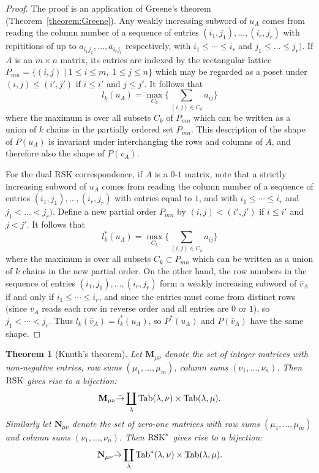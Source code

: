 \documentclass[11pt]{amsart}
\newtheorem{theorem}{Theorem}[subsection]
\theoremstyle{definition}
\theoremstyle{example}
\newcommand{\Tab}{\textup{Tab}}
\newcommand{\rsk}{\textup{RSK}}
\begin{document}
\begin{proof}
  The proof is an application of Greene's theorem (Theorem~\ref{theorem:Greene}).
  Any weakly increasing subword of $u_A$ comes from reading the column number of a sequence of entries $(i_1,j_1),\dotsc,(i_r,j_r)$ with repititions of up to $a_{i_1j_1},\dotsc, a_{i_rj_r}$ respectively, with $i_1\leq \dotsb \leq i_r$ and $j_1\leq \dotsc\leq j_r)$.
  If $A$ is an $m\times n$ matrix, its entries are indexed by the rectangular lattice $P_{mn} = \{(i,j)\mid 1\leq i\leq m,\;1\leq j\leq n\}$ which may be regarded as a poset under $(i,j)\leq (i',j')$ if $i\leq i'$ and $j\leq j'$.
  It follows that
  \begin{displaymath}
    l_k(u_A) = \max_{C_k} \Big\{\sum_{(i,j)\in C_k} a_{ij}\Big\}
  \end{displaymath}
  where the maximum is over all subsets $C_k$ of $P_{mn}$ which can be written as a union of $k$ chains in the partially ordered set $P_{mn}$.
  This description of the shape of $P(u_A)$ is invariant under interchanging the rows and columns of $A$, and therefore also the shape of $P(v_A)$.

  For the dual RSK correspondence, if $A$ is a $0$-$1$ matrix, note that a strictly increasing subword of $u_A$ comes from reading the column number of a sequence of entries $(i_1,j_1),\dotsc,(i_r,j_r)$ with entries equal to $1$, and with $i_1\leq \dotsb \leq i_r$ and $j_1<\dotsc<j_r)$.
  Define a new partial order $P_{mn}$ by $(i,j)<(i',j')$ if $i\leq i'$ and $j<j'$.
  It follows that
  \begin{displaymath}
    l_k^*(u_A) = \max_{C_k} \Big\{\sum_{(i,j)\in C_k} a_{ij}\Big\}
  \end{displaymath}
  where the maximum is over all subsets $C_k\subset P_{mn}$ which can be written as a union of $k$ chains in the new partial order.
  On the other hand, the row numbers in the sequence of entries $(i_1,j_1),\dotsc,(i_r,j_r)$ form a weakly increasing subword of $\bar v_A$ if and only if $i_1\leq \dotsb \leq i_r$, and since the entries must come from distinct rows (since $\bar v_A$ reads each row in reverse order and all entries are $0$ or $1$), so $j_1<\dotsb < j_r$.
  Thus $l_k(\bar v_A)=l_k^*(u_A)$, so $P^*(u_A)$ and $P(\bar v_A)$ have the same shape.
\end{proof}
\begin{theorem}
  [Knuth's theorem]
  \label{theorem:knuth}
  Let $\mathbf M_{\mu\nu}$ denote the set of integer matrices with non-negative entries, row sums $(\mu_1,\dotsc, \mu_m)$, column sums $(\nu_1,\dotsc,\nu_n)$.
  Then $\rsk$ gives rise to a bijection:
  \begin{equation}
    \label{eq:rsk}
    \mathbf M_{\mu\nu}\tilde\to \coprod_\lambda \Tab(\lambda,\nu)\times \Tab(\lambda,\mu).
  \end{equation}
  Similarly let $\mathbf N_{\mu\nu}$ denote the set of zero-one matrices with row sums $(\mu_1,\dotsc, \mu_m)$ and column sums $(\nu_1,\dotsc,\nu_n)$.
  Then $\rsk^*$ gives rise to a bijection:
  \begin{equation}
    \label{eq:drsk}
    \mathbf N_{\mu\nu}\tilde\to \coprod_\lambda \Tab^*(\lambda,\nu)\times \Tab(\lambda,\mu).
  \end{equation}
\end{theorem}
\end{document}
